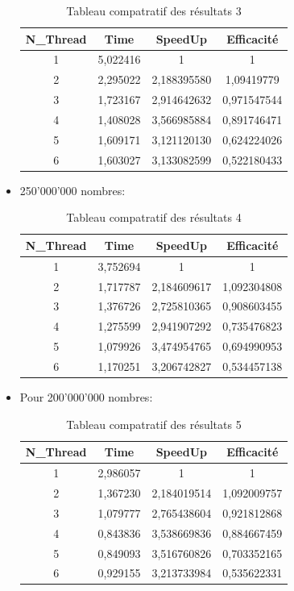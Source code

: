 \documentclass{report}
\begin{document}
\begin{itemize}
	\begin{table}[H]
			\center
			\begin{tabular}{|c|c|c|c|}
				\hline
				N\_Thread	&	Time	& SpeedUp	& Efficacité \\
				\hline
				1	&	5,022416	& 1	&	1	\\
				\hline
				2	&	2,295022	& 2,188395580	&	1,09419779	\\
				\hline
				3	&	1,723167	& 2,914642632		&	0,971547544	\\
				\hline
				4	&	1,408028	& 3,566985884	&	0,891746471	\\
				\hline
				5	&	1,609171	& 3,121120130	&	0,624224026	\\
				\hline
				6	&	1,603027	& 3,133082599		&	0,522180433\\
				\hline
			\end{tabular}
		\caption{Tableau compatratif des résultats 3}
	\end{table}
	\item 250'000'000 nombres:\\
	\begin{table}[H]
			\center
			\begin{tabular}{|c|c|c|c|}
				\hline
				N\_Thread	&	Time	& SpeedUp	& Efficacité \\
				\hline
				1	&	3,752694	& 1	&	1	\\
				\hline
				2	&	1,717787	& 2,184609617	&	1,092304808	\\
				\hline
				3	&	1,376726	& 2,725810365		&	0,908603455	\\
				\hline
				4	&	1,275599	& 2,941907292	&	0,735476823	\\
				\hline
				5	&	1,079926	& 3,474954765	&	0,694990953	\\
				\hline
				6	&	1,170251	& 3,206742827	&	0,534457138	\\
				\hline
			\end{tabular}
		\caption{Tableau compatratif des résultats 4}
	\end{table}
	\item Pour 200'000'000 nombres:\\
	\begin{table}[H]
			\center
			\begin{tabular}{|c|c|c|c|}
				\hline
				N\_Thread	&	Time	& SpeedUp	& Efficacité \\
				\hline
				1	&	2,986057	& 1	&	1	\\
				\hline
				2	&	1,367230	& 2,184019514	&	1,092009757	\\
				\hline
				3	&	1,079777	& 2,765438604		&	0,921812868	\\
				\hline
				4	&	0,843836	& 3,538669836	&	0,884667459	\\
				\hline
				5	&	0,849093	& 3,516760826		&	0,703352165\\
				\hline
				6	&	0,929155	& 3,213733984	&	0,535622331\\
				\hline
			\end{tabular}
		\caption{Tableau compatratif des résultats 5}
	\end{table}
\end{itemize}
\end{document}
